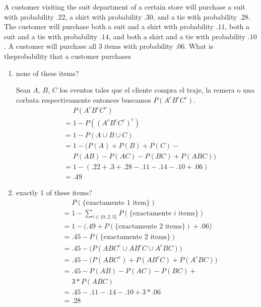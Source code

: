 \item A customer visiting the suit department of a certain store will purchase a suit with probability $.22$, a shirt with probability $.30$, and a tie with probability $.28$. The customer will purchase both a suit and a shirt with probability $.11$, both a suit and a tie with probability $.14$, and both a shirt and a tie with probability $.10$. A customer will purchase all 3 items with probability $.06$. What is theprobability that a customer purchases
\begin{enumerate}
    \item none of these items?

    Sean $A$, $B$, $C$ los eventos tales que el cliente compra el traje, la remera o una corbata respectivamente entonces buscamos $P(A^c B^c C^c)$.
    \begin{align*}
        &\phantom{{}={}} P(A^c B^c C^c)\\
        &= 1 - P((A^c B^c C^c)^c)\\
        &= 1 - P(A \cup B \cup C)\\
        &= 1 - \Big ( P(A) + P(B) + P(C) - {}\\
        &\phantom{{}={}} P(A B) -
        P(A C) -
        P(B C) + P(A B C) \Big )\\
        &= 1 - ( .22 + .3 + .28 - .11 - .14 - .10 + .06 )\\
        &= .49
    \end{align*}
    
    \item exactly 1 of these items?
    \begin{align*}
        &\phantom{{}={}} P(\{\text{exactamente 1 item}\})\\
        &= 1 - \sum_{i\in\{0,2,3\}} P(\{\text{exactamente $i$ items}\})\\
        &= 1 - \big( .49 + P(\{\text{exactamente 2 items}\}) + .06 \big)\\
        &= .45 - P(\{\text{exactamente 2 items}\})\\
        &= .45 - \big ( P(ABC^c \cup AB^cC \cup A^cBC) \big )\\
        &= .45 - \big ( P(ABC^c) + P(AB^cC) + P(A^cBC) \big )\\
        &= .45 - P(AB) - P(AC) - P(BC) + {}\\
        &\phantom{{}={}} 3 * P(ABC)\\
        &= .45 - .11 - .14 - .10 + 3 * .06\\
        &= .28
    \end{align*}
\end{enumerate}